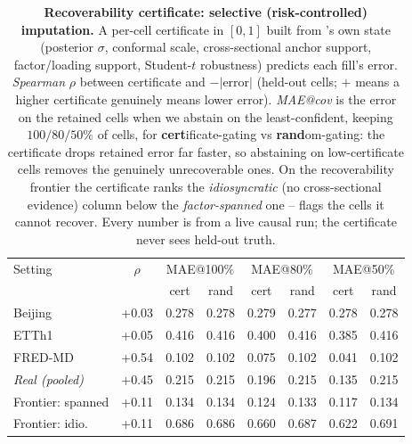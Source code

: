 \begin{table}[t]\centering\small
\setlength{\tabcolsep}{4pt}
\caption{\textbf{Recoverability certificate: selective (risk-controlled) imputation.} A per-cell certificate in $[0,1]$ built from \cafe{}'s own state (posterior $\sigma$, conformal scale, cross-sectional anchor support, factor/loading support, Student-$t$ robustness) predicts each fill's error. \emph{Spearman} $\rho$ between certificate and $-|$error$|$ (held-out cells; $+$ means a higher certificate genuinely means lower error). \emph{MAE@cov} is the error on the retained cells when we abstain on the least-confident, keeping $100/80/50\%$ of cells, for \textbf{cert}ificate-gating vs \textbf{rand}om-gating: the certificate drops retained error far faster, so abstaining on low-certificate cells removes the genuinely unrecoverable ones. On the recoverability frontier the certificate ranks the \emph{idiosyncratic} (no cross-sectional evidence) column below the \emph{factor-spanned} one -- \cafe{} flags the cells it cannot recover. Every number is from a live causal run; the certificate never sees held-out truth.}
\label{tab:recoverability}
\begin{tabular}{@{}lccccccc@{}}
\toprule
Setting & $\rho$ & \multicolumn{2}{c}{MAE@100\%} & \multicolumn{2}{c}{MAE@80\%} & \multicolumn{2}{c}{MAE@50\%} \\
 & & cert & rand & cert & rand & cert & rand \\
\midrule
Beijing & +0.03 & 0.278 & 0.278 & 0.279 & 0.277 & 0.278 & 0.278 \\
ETTh1 & +0.05 & 0.416 & 0.416 & 0.400 & 0.416 & 0.385 & 0.416 \\
FRED-MD & +0.54 & 0.102 & 0.102 & 0.075 & 0.102 & 0.041 & 0.102 \\
\emph{Real (pooled)} & +0.45 & 0.215 & 0.215 & 0.196 & 0.215 & 0.135 & 0.215 \\
Frontier: spanned & +0.11 & 0.134 & 0.134 & 0.124 & 0.133 & 0.117 & 0.134 \\
Frontier: idio. & +0.11 & 0.686 & 0.686 & 0.660 & 0.687 & 0.622 & 0.691 \\
\bottomrule
\end{tabular}
\end{table}
